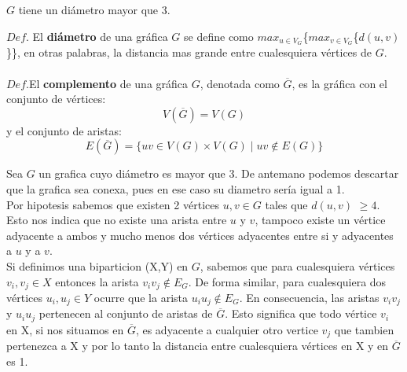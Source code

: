 \documentclass[12pt]{article}
\begin{document}
\begin{tcolorbox}[title=\textbf{Hipotesis}, colback=red!15!white, colframe=black!, breakable]
    $G$ tiene un diámetro mayor que 3.
\end{tcolorbox}
\begin{tcolorbox}[title=\textbf{Definiciones}, colback=blue!15!white, colframe=black!, breakable]
    $Def$. El \textbf{diámetro} de una gráfica $G$ se define como $max_{u\in V_G}$\{$max_{v\in V_G}$\{${d(u,v)}$\}\}, en otras palabras, la distancia mas grande entre cualesquiera vértices de $G$.
    \\
    \\
    $Def$.El \textbf{complemento} de una gráfica $G$, denotada como $\overline{G}$, es la gráfica con el conjunto de vértices:
    \[V(\overline{G}) = V(G)\]
    y el conjunto de aristas:
    \[E(\overline{G}) = \{ uv \in V(G) \times V(G) \mid uv \notin E(G)\}\]
\end{tcolorbox}

Sea $G$ un grafica cuyo diámetro es mayor que 3. De antemano podemos descartar que la grafica sea conexa, pues en ese caso su diametro sería igual a 1.\\

Por hipotesis sabemos que existen 2 vértices $u,v\in G$ tales que $d(u,v)$ $\geq 4$. Esto nos indica que no existe una arista entre $u$ y $v$, tampoco existe un vértice adyacente a ambos y mucho menos dos vértices adyacentes entre si y adyacentes a $u$ y a $v$.\\

Si definimos una biparticion (X,Y) en $G$, sabemos que para cualesquiera vértices  $v_i,v_j \in X$ entonces la arista $v_iv_j \notin E_G$. De forma similar, para cualesquiera dos vértices $u_i,u_j \in Y$ ocurre que la arista  $u_iu_j \notin E_G$. En consecuencia, las aristas  $v_iv_j$ y $u_iu_j$ pertenecen al conjunto de aristas de $\overline{G}$. Esto significa que todo vértice $v_i$ en X, si nos situamos en $\overline{G}$, es adyacente a cualquier otro vertice $v_j$ que tambien pertenezca a X y por lo tanto la distancia entre cualesquiera vértices en X y en $\overline{G}$ es 1.\\
	
\end{document}
